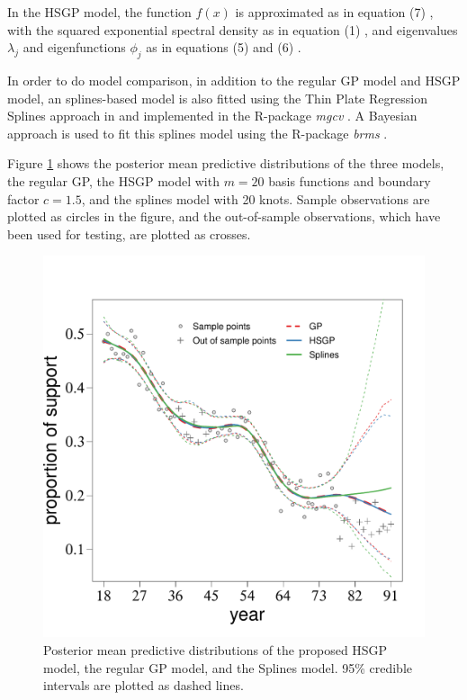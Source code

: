 \documentclass[onecolumn,a4paper,11pt]{article}
\begin{document}
In the HSGP model, the function $f(x)$ is approximated as in equation (7)%
, with the squared exponential spectral density as in equation (1)%
, and eigenvalues $\lambda_j$  and eigenfunctions $\phi_j$ as in equations (5) %
and (6)%
. 

In order to do model comparison, in addition to the regular GP model and HSGP model, an splines-based model is also fitted using the Thin Plate Regression Splines approach in \cite{wood2003thin} and implemented in the R-package \textit{mgcv} \citep{wood2011mgcv}. A Bayesian approach is used to fit this splines model using the R-package \textit{brms} \citep{burkner2017brms}.

Figure \ref{ch5_fig12_Posteriors_gaydata} shows the posterior mean predictive distributions of the three models, the regular GP, the HSGP model with $m=20$ basis functions and boundary factor $c=1.5$, and the splines model with 20 knots. Sample observations are plotted as circles in the figure, and the out-of-sample observations, which have been used for testing, are plotted as crosses.

\begin{figure}
\centering
\includegraphics[scale=0.50]{ch5_fig12_Posteriors_gaydata.pdf}
\caption{Posterior mean predictive distributions of the proposed HSGP model, the regular GP model, and the Splines model. 95\% credible intervals are plotted as dashed lines.}
  \label{ch5_fig12_Posteriors_gaydata}
\end{figure}
\end{document}
